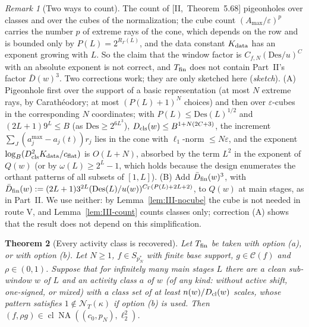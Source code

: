 \documentclass[10pt]{amsart}
\newtheorem{theorem}{Theorem}[section]
\theoremstyle{definition}
\theoremstyle{remark}
\newtheorem{remark}[theorem]{Remark}
\newcommand{\NA}{\operatorname{NA}}
\newcommand{\Cset}{\mathcal C}
\newcommand{\cl}{\operatorname{cl}}
\begin{document}
\begin{remark}[Two ways to count]\label{rem:III-count}
The count of [II,~Theorem~5.68] pigeonholes over classes and over the cubes of
the normalization; the cube count $(A_{\max}/\varepsilon)^p$ carries the number $p$
of extreme rays of the cone, which depends on the row and is bounded only by
$P(L)=2^{R_\Gamma(L)}$, and the data constant $K_{\rm data}$ has an exponent
growing with $L$.  So the claim that the window factor is $C_{f,N}(\mathrm{Des}/u)^C$
with an absolute exponent is not correct, and $T_{\rm fin}$ does not contain
Part~II's factor $\bar D(w)^3$.  Two corrections work; they are only
sketched here (\emph{sketch}).  (A) Pigeonhole first
over the support of a basic representation (at most $N$ extreme rays, by
Carath\'eodory; at most $(P(L)+1)^N$ choices) and then over $\varepsilon$-cubes in
the corresponding $N$ coordinates; with $P(L)\le\mathrm{Des}(L)^{1/2}$ and
$(2L+1)9^L\le B$ (as $\mathrm{Des}\ge2^{6L^3}$), $D_{\rm cls}(w)\le B^{1+N(2C+3)}$, the
increment $\sum_J(a^{\max}_j-a_j(t))r_j$ lies in the cone with $\ell_1$-norm
$\le N\varepsilon$, and the exponent $\log_B(D_{\rm cls}^2K_{\rm data}/c_{\rm flat})$ is
$O(L+N)$, absorbed by the term $L^2$ in the exponent of $Q(w)$ (or by
$\omega(L)\ge2^L-1$, which holds because the design enumerates the orthant
patterns of all subsets of $[1,L]$).  (B) Add $\bar D_{\rm fin}(w)^3$, with
$\bar D_{\rm fin}(w):=(2L+1)3^{2L}(\mathrm{Des}(L)/u(w))^{C_\Gamma(P(L)+2L+2)}$, to $Q(w)$
at main stages, as in Part~II.  We use neither: by Lemma~\ref{lem:III-nocube}
the cube is not needed in route V, and Lemma~\ref{lem:III-count} counts
classes only; correction (A) shows that the result does not depend on this
simplification.
\end{remark}

\begin{theorem}[Every activity class is recovered]\label{thm:III-Ctr}
Let $T_{\rm fin}$ be taken with option \textup{(a)}, or with option \textup{(b)}.
Let $N\ge1$, $f\in S_{p_N^*}$ with finite base support, $g\in\Cset(f)$ and
$\rho\in(0,1)$.  Suppose that for infinitely many main stages $L$ there are a
clean sub-window $w$ of $L$ and an activity class $a$ of $w$ \textup{(}of any
kind: without active shift, one-signed, or mixed\textup{)} with a class set of
at least $n(w)/D_{\rm cl}(w)$ scales, whose pattern satisfies $1\notin\mathcal
N_T(\kappa)$ if option \textup{(b)} is used.  Then $(f,\rho g)\in\cl\NA((c_0,p_N),
\ell_2^2)$.
\end{theorem}
\end{document}
